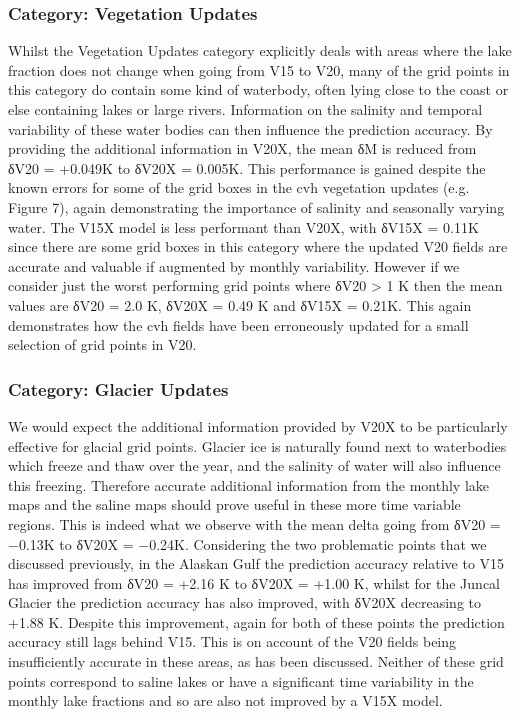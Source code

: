 \documentclass[hess, twostagejnl]{copernicus}
\begin{document}
\subsubsection{Category: Vegetation Updates}
Whilst the Vegetation Updates category explicitly deals with areas where the lake fraction does not change when going from V15 to V20, many of the grid points in this category do contain some kind of waterbody, often lying close to the coast or else containing lakes or large rivers. Information on the salinity and temporal variability of these water bodies can then influence the prediction accuracy. By providing the additional information in V20X, the mean δM is reduced from δV20 = +0.049K to δV20X = 0.005K. This performance is gained despite the known errors for some of the grid boxes in the cvh vegetation updates (e.g. Figure 7), again demonstrating the importance of salinity and seasonally varying water. The V15X model is less performant than V20X, with δV15X = 0.11K since there are some grid boxes in this category where the updated V20 fields are accurate and valuable if augmented by monthly variability. However if we consider just the worst performing grid points where δV20 > 1 K then the mean values are δV20 = 2.0 K, δV20X = 0.49 K and δV15X = 0.21K. This again demonstrates how the cvh fields have been erroneously updated for a small selection of grid points in V20.



\subsubsection{Category: Glacier Updates}
We would expect the additional information provided by V20X to be particularly effective for glacial grid points. Glacier ice is naturally found next to waterbodies which freeze and thaw over the year, and the salinity of water will also influence this freezing. Therefore accurate additional information from the monthly lake maps and the saline maps should prove useful in these more time variable regions. This is indeed what we observe with the mean delta going from δV20 = −0.13K to δV20X = −0.24K. Considering the two problematic points that we discussed previously, in the Alaskan Gulf the prediction accuracy relative to V15 has improved from δV20 = +2.16 K to δV20X = +1.00 K, whilst for the Juncal Glacier the prediction accuracy has also improved, with δV20X decreasing to +1.88 K. Despite this improvement, again for both of these points the prediction accuracy still lags behind V15. This is on account of the V20 fields being insufficiently accurate in these areas, as has been discussed. Neither of these grid points correspond to saline lakes or have a significant time variability in the monthly lake fractions and so are also not improved by a V15X model.
\end{document}
